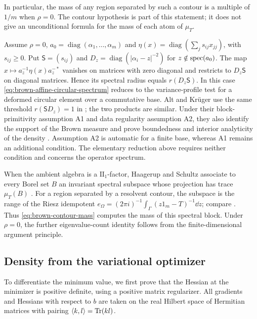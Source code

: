 In particular, the mass of any region separated by such a contour is a multiple of $1/m$ when $\rho=0$.
The contour hypothesis is part of this statement; it does not give an unconditional formula for the mass of each atom of $\mu_T$.

\begin{remark}
\label{rem:brown-variance-profile}
Assume $\rho=0$, $a_0=\operatorname{diag}(\alpha_1,\ldots,\alpha_m)$ and $\eta(x)=\operatorname{diag}(\sum_j s_{ij}x_{jj})$, with $s_{ij}\ge0$.
Put $\mathsf S=(s_{ij})$ and $D_z=\operatorname{diag}(|\alpha_i-z|^{-2})$ for $z\notin\operatorname{spec}(a_0)$.
The map $x\mapsto a_z^{-1}\eta(x)a_z^{-*}$ vanishes on matrices with zero diagonal and restricts to $D_z\mathsf S$ on diagonal matrices.
Hence its spectral radius equals $r(D_z\mathsf S)$.
In this case \eqref{eq:brown-affine-circular-spectrum} reduces to the variance-profile test for a deformed circular element over a commutative base.
Alt and Kr\"uger use the same threshold $r(\mathsf S D_z)=1$ in \cite[arXiv version, Proposition~5.16]{AK26}; the two products are similar.
Under their block-primitivity assumption A1 and data regularity assumption A2, they also identify the support of the Brown measure and prove boundedness and interior analyticity of the density \cite[arXiv version, Theorem~2.2]{AK26}.
Assumption A2 is automatic for a finite base, whereas A1 remains an additional condition.
The elementary reduction above requires neither condition and concerns the operator spectrum.
\end{remark}

\begin{remark}
\label{rem:brown-spectral-subspaces}
When the ambient algebra is a $\mathrm{II}_1$-factor, Haagerup and Schultz associate to every Borel set $B$ an invariant spectral subspace whose projection has trace $\mu_T(B)$ \cite[Theorem~1.1]{HS09}.
For a region separated by a resolvent contour, the subspace is the range of the Riesz idempotent $e_\Omega=(2\pi i)^{-1}\int_\Gamma(z1_m-T)^{-1}\dd z$; compare \cite[Introduction, (1.3)]{HS09}.
Thus \eqref{eq:brown-contour-mass} computes the mass of this spectral block.
Under $\rho=0$, the further eigenvalue-count identity follows from the finite-dimensional argument principle.
\end{remark}

\subsection{Density from the variational optimizer}
\label{subsec:brown-density}
To differentiate the minimum value, we first prove that the Hessian at the minimizer is positive definite, using a positive matrix regularizer.
All gradients and Hessians with respect to $b$ are taken on the real Hilbert space of Hermitian matrices with pairing $\langle k,l\rangle=\operatorname{Tr}(kl)$.


